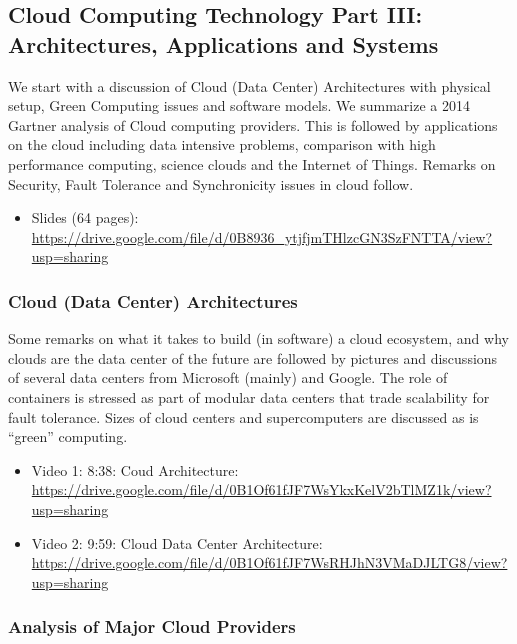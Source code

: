 \subsection{Cloud Computing Technology Part III: Architectures,
Applications and
Systems}\label{cloud-computing-technology-part-iii-architectures-applications-and-systems}

We start with a discussion of Cloud (Data Center) Architectures with
physical setup, Green Computing issues and software models. We summarize
a 2014 Gartner analysis of Cloud computing providers. This is followed
by applications on the cloud including data intensive problems,
comparison with high performance computing, science clouds and the
Internet of Things. Remarks on Security, Fault Tolerance and
Synchronicity issues in cloud follow.

\begin{itemize}
\tightlist
\item
  Slides (64 pages):
  \url{https://drive.google.com/file/d/0B8936_ytjfjmTHlzcGN3SzFNTTA/view?usp=sharing}
\end{itemize}

\subsubsection{Cloud (Data Center)
Architectures}\label{cloud-data-center-architectures}

Some remarks on what it takes to build (in software) a cloud ecosystem,
and why clouds are the data center of the future are followed by
pictures and discussions of several data centers from Microsoft (mainly)
and Google. The role of containers is stressed as part of modular data
centers that trade scalability for fault tolerance. Sizes of cloud
centers and supercomputers are discussed as is ``green'' computing.

\begin{itemize}
\tightlist
\item
  Video 1: 8:38: Coud Architecture:
  \url{https://drive.google.com/file/d/0B1Of61fJF7WsYkxKelV2bTlMZ1k/view?usp=sharing}
\item
  Video 2: 9:59: Cloud Data Center Architecture:
  \url{https://drive.google.com/file/d/0B1Of61fJF7WsRHJhN3VMaDJLTG8/view?usp=sharing}
\end{itemize}

\subsubsection{Analysis of Major Cloud
Providers}\label{analysis-of-major-cloud-providers}

